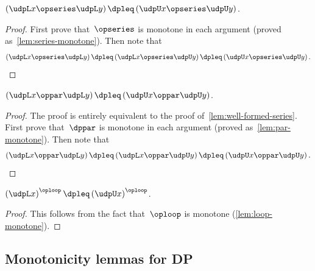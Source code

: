 \begin{lemma}
  \label{lem:well-formed-series}$\left(\udpL x\opseries\udpL y\right)\dpleq\left(\udpU x\opseries\udpU y\right)$.
\end{lemma}
\begin{proof}
  First prove that~$\opseries$ is monotone in each argument (proved
  as~\cref{lem:series-monotone}). Then note that
  \[
    \left(\udpL x\opseries\udpL y\right)\dpleq\left(\udpL x\opseries\udpU y\right)\dpleq\left(\udpU x\opseries\udpU y\right).
  \]
\end{proof}
\begin{lemma}
  \label{lem:well-formed-par}$\left(\udpL x\oppar\udpL y\right)\dpleq\left(\udpU x\oppar\udpU y\right)$.
\end{lemma}
\begin{proof}
  The proof is entirely equivalent to the proof of~\cref{lem:well-formed-series}.
  First prove that~$\dppar$ is monotone in each argument (proved as~\cref{lem:par-monotone}).
  Then note that~
  \[
    \left(\udpL x\oppar\udpL y\right)\dpleq\left(\udpL x\oppar\udpU y\right)\dpleq\left(\udpU x\oppar\udpU y\right).
  \]
\end{proof}

\begin{lemma}
  \label{lem:well-formed-loop}$\left(\udpL x\right)^{\oploop}\dpleq\left(\udpU x\right)^{\oploop}$.
\end{lemma}
\begin{proof}
  This follows from the fact that~$\oploop$ is monotone (\cref{lem:loop-monotone}).
\end{proof}

\subsection{Monotonicity lemmas for DP}

